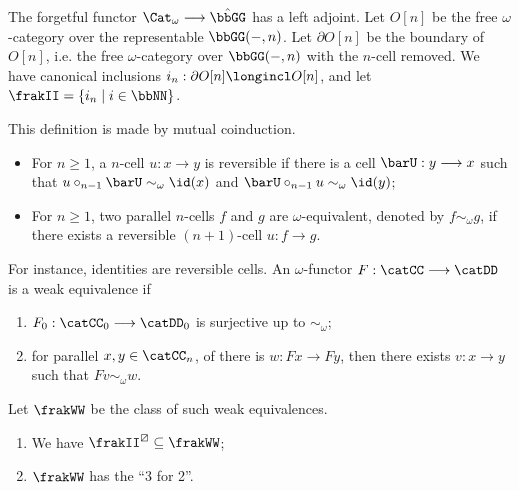 \documentclass{article}
\newcommand{\Weq}{\frakWW}
\begin{document}
The forgetful functor $\Cat_\omega \longrightarrow \hat{\bbGG}$ has a left adjoint. Let $O[n]$ be the free $\omega$-category over the representable $\bbGG (-, n)$. Let $\partial O [n]$ be the boundary of $O [n]$, i.e. the free $\omega$-category over $\bbGG (-, n)$ with the $n$-cell removed. We have canonical inclusions $i_n : \partial O [n] \longincl O [n]$, and let $\frakII = \{ i_n \mid i \in \bbNN \}$.

\begin{definition}
This definition is made by mutual coinduction.
\begin{itemize}
	\item For $n \geq 1$, a $n$-cell $u : x \longrightarrow y$ is reversible if there is a cell $\barU : y \longrightarrow x$ such that $u \circ_{n-1} \barU \sim_\omega \id (x)$ and $\barU \circ_{n-1} u \sim_\omega \id (y)$;
	\item For $n \geq 1$, two parallel $n$-cells $f$ and $g$ are $\omega$-equivalent, denoted by $f \sim_\omega g$, if there exists a reversible $(n+1)$-cell $u : f \longrightarrow g$.
\end{itemize}
\end{definition}

For instance, identities are reversible cells. An $\omega$-functor $F : \catCC \longrightarrow \catDD$ is a weak equivalence if
\begin{enumerate}
	\item $F_0 : \catCC_0 \longrightarrow \catDD_0$ is surjective up to $\sim_\omega$;
	\item for parallel $x, y \in \catCC_n$, of there is $w : Fx \longrightarrow Fy$, then there exists $v : x \longrightarrow y$ such that $Fv \sim_\omega w$.
\end{enumerate}
Let $\Weq$ be the class of such weak equivalences.

\begin{proposition}
\begin{enumerate}
	\item We have $\frakII^\boxslash \subseteq \Weq$;
	\item $\Weq$ has the ``3 for 2''.
\end{enumerate}
\end{proposition}

\nocite{*}


\end{document}
